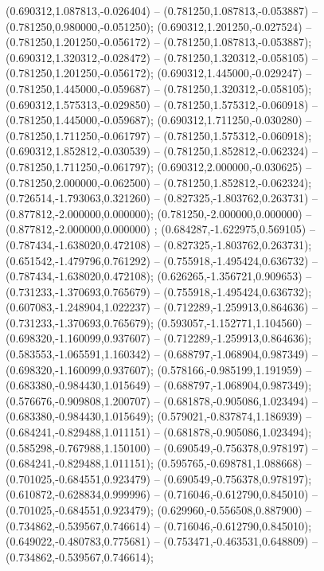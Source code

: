  (0.690312,1.087813,-0.026404) -- (0.781250,1.087813,-0.053887) -- (0.781250,0.980000,-0.051250);
 (0.690312,1.201250,-0.027524) -- (0.781250,1.201250,-0.056172) -- (0.781250,1.087813,-0.053887);
 (0.690312,1.320312,-0.028472) -- (0.781250,1.320312,-0.058105) -- (0.781250,1.201250,-0.056172);
 (0.690312,1.445000,-0.029247) -- (0.781250,1.445000,-0.059687) -- (0.781250,1.320312,-0.058105);
 (0.690312,1.575313,-0.029850) -- (0.781250,1.575312,-0.060918) -- (0.781250,1.445000,-0.059687);
 (0.690312,1.711250,-0.030280) -- (0.781250,1.711250,-0.061797) -- (0.781250,1.575312,-0.060918);
 (0.690312,1.852812,-0.030539) -- (0.781250,1.852812,-0.062324) -- (0.781250,1.711250,-0.061797);
 (0.690312,2.000000,-0.030625) -- (0.781250,2.000000,-0.062500) -- (0.781250,1.852812,-0.062324);
 (0.726514,-1.793063,0.321260) -- (0.827325,-1.803762,0.263731) -- (0.877812,-2.000000,0.000000);
 (0.781250,-2.000000,0.000000) -- (0.877812,-2.000000,0.000000) ;
 (0.684287,-1.622975,0.569105) -- (0.787434,-1.638020,0.472108) -- (0.827325,-1.803762,0.263731);
 (0.651542,-1.479796,0.761292) -- (0.755918,-1.495424,0.636732) -- (0.787434,-1.638020,0.472108);
 (0.626265,-1.356721,0.909653) -- (0.731233,-1.370693,0.765679) -- (0.755918,-1.495424,0.636732);
 (0.607083,-1.248904,1.022237) -- (0.712289,-1.259913,0.864636) -- (0.731233,-1.370693,0.765679);
 (0.593057,-1.152771,1.104560) -- (0.698320,-1.160099,0.937607) -- (0.712289,-1.259913,0.864636);
 (0.583553,-1.065591,1.160342) -- (0.688797,-1.068904,0.987349) -- (0.698320,-1.160099,0.937607);
 (0.578166,-0.985199,1.191959) -- (0.683380,-0.984430,1.015649) -- (0.688797,-1.068904,0.987349);
 (0.576676,-0.909808,1.200707) -- (0.681878,-0.905086,1.023494) -- (0.683380,-0.984430,1.015649);
 (0.579021,-0.837874,1.186939) -- (0.684241,-0.829488,1.011151) -- (0.681878,-0.905086,1.023494);
 (0.585298,-0.767988,1.150100) -- (0.690549,-0.756378,0.978197) -- (0.684241,-0.829488,1.011151);
 (0.595765,-0.698781,1.088668) -- (0.701025,-0.684551,0.923479) -- (0.690549,-0.756378,0.978197);
 (0.610872,-0.628834,0.999996) -- (0.716046,-0.612790,0.845010) -- (0.701025,-0.684551,0.923479);
 (0.629960,-0.556508,0.887900) -- (0.734862,-0.539567,0.746614) -- (0.716046,-0.612790,0.845010);
 (0.649022,-0.480783,0.775681) -- (0.753471,-0.463531,0.648809) -- (0.734862,-0.539567,0.746614);
